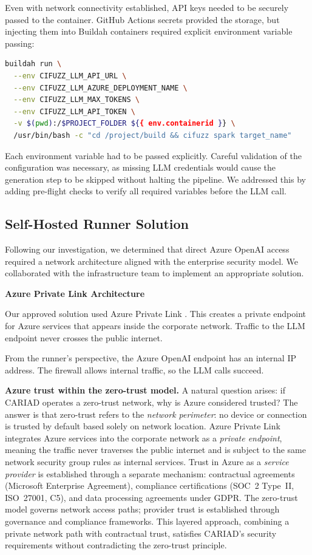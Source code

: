 Even with network connectivity established, API keys needed to be securely passed to the container. GitHub Actions secrets provided the storage, but injecting them into Buildah containers required explicit environment variable passing:

\begin{lstlisting}[language=bash]
buildah run \
  --env CIFUZZ_LLM_API_URL \
  --env CIFUZZ_LLM_AZURE_DEPLOYMENT_NAME \
  --env CIFUZZ_LLM_MAX_TOKENS \
  --env CIFUZZ_LLM_API_TOKEN \
  -v $(pwd):/$PROJECT_FOLDER ${{ env.containerid }} \
  /usr/bin/bash -c "cd /project/build && cifuzz spark target_name"
\end{lstlisting}

Each environment variable had to be passed explicitly. Careful validation of the configuration was necessary, as missing LLM credentials would cause the generation step to be skipped without halting the pipeline. We addressed this by adding pre-flight checks to verify all required variables before the LLM call.

\subsection{Self-Hosted Runner Solution}

Following our investigation, we determined that direct Azure OpenAI access required a network architecture aligned with the enterprise security model. We collaborated with the infrastructure team to implement an appropriate solution.

\textbf{Azure Private Link Architecture}

Our approved solution used Azure Private Link \cite{azure_private_link}. This creates a private endpoint for Azure services that appears inside the corporate network. Traffic to the LLM endpoint never crosses the public internet.

From the runner's perspective, the Azure OpenAI endpoint has an internal IP address. The firewall allows internal traffic, so the LLM calls succeed.

\textbf{Azure trust within the zero-trust model.} A natural question arises: if CARIAD operates a zero-trust network, why is Azure considered trusted? The answer is that zero-trust refers to the \emph{network perimeter}: no device or connection is trusted by default based solely on network location. Azure Private Link integrates Azure services into the corporate network as a \emph{private endpoint}, meaning the traffic never traverses the public internet and is subject to the same network security group rules as internal services. Trust in Azure as a \emph{service provider} is established through a separate mechanism: contractual agreements (Microsoft Enterprise Agreement), compliance certifications (SOC~2 Type~II, ISO~27001, C5), and data processing agreements under GDPR. The zero-trust model governs network access paths; provider trust is established through governance and compliance frameworks. This layered approach, combining a private network path with contractual trust, satisfies CARIAD's security requirements without contradicting the zero-trust principle.


